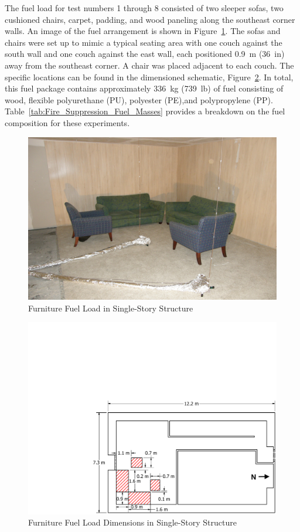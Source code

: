\documentclass[12pt,oneside]{book}
\begin{document}
The fuel load for test numbers 1 through 8 consisted of two sleeper sofas, two cushioned chairs, carpet, padding, and wood paneling along the southeast corner walls. An image of the fuel arrangement is shown in Figure~\ref{fig:Furniture_Fuel_Load}. The sofas and chairs were set up to mimic a typical seating area with one couch against the south wall and one couch against the east wall, each positioned 0.9~m (36~in) away from the southeast corner. A chair was placed adjacent to each couch. The specific locations can be found in the dimensioned schematic, Figure~\ref{fig:Furniture_Fuel_Load_Dimensions}. In total, this fuel package contains approximately 336~kg (739~lb) of fuel consisting of wood, flexible polyurethane (PU), polyester (PE),and polypropylene (PP). Table~\ref{tab:Fire_Suppression_Fuel_Masses} provides a breakdown on the fuel composition for these experiments.

\begin{figure}[!ht]
	\includegraphics[width=.8\columnwidth]{../Figures/Pictures/Furniture_Fuel_Load}
	\caption{Furniture Fuel Load in Single-Story Structure}
	\label{fig:Furniture_Fuel_Load}
\end{figure}

\begin{figure}[!ht]
	\includegraphics[width=\columnwidth]{../Figures/Floor_Plans/PDFs/East_Structure/DelCo_2012_East_Structure_Furniture}
	\caption{Furniture Fuel Load Dimensions in Single-Story Structure}
	\label{fig:Furniture_Fuel_Load_Dimensions}
\end{figure}
\end{document}
